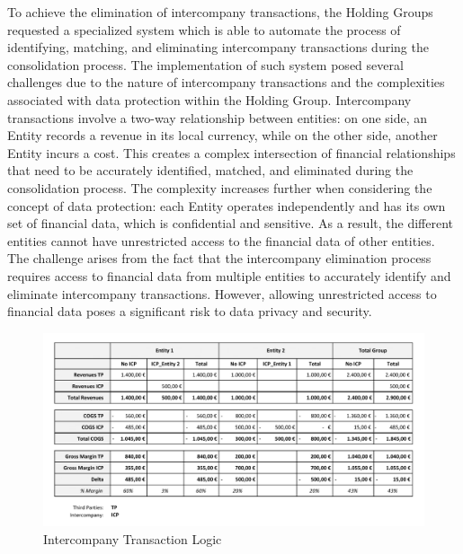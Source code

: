 \documentclass[12pt,a4paper,openright,twoside]{book}
\begin{document}
To achieve the elimination of intercompany transactions, the Holding Groups requested a specialized system which is able to automate the process of identifying, matching, and eliminating intercompany transactions during the consolidation process.
%
The implementation of such system posed several challenges due to the nature of intercompany transactions and the complexities associated with data protection within the Holding Group.
%
Intercompany transactions involve a two-way relationship between entities: on one side, an Entity records a revenue in its local currency, while on the other side, another Entity incurs a cost. 
%
This creates a complex intersection of financial relationships that need to be accurately identified, matched, and eliminated during the consolidation process.
%
The complexity increases further when considering the concept of data protection: each Entity operates independently and has its own set of financial data, which is confidential and sensitive. 
%
As a result, the different entities cannot have unrestricted access to the financial data of other entities.
%
The challenge arises from the fact that the intercompany elimination process requires access to financial data from multiple entities to accurately identify and eliminate intercompany transactions.
%
However, allowing unrestricted access to financial data poses a significant risk to data privacy and security.

\begin{figure}[htbp]
	\centering
	\includegraphics[width=\linewidth]{figures/intercompany.pdf}
	\caption{Intercompany Transaction Logic}
	\label{fig:icp}
\end{figure}
\end{document}
